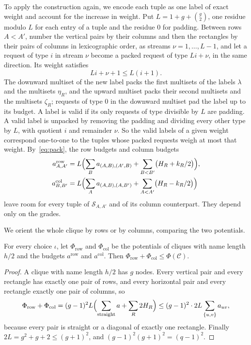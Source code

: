\documentclass[11pt]{article}
\theoremstyle{definition}
\theoremstyle{definition}
\theoremstyle{remark}
\newcommand{\row}{\mathrm{row}}
\newcommand{\col}{\mathrm{col}}
\begin{document}
To apply the construction again, we encode each tuple as one label of exact weight and account for the increase in weight. Put $L=1+g+\binom g2$, one residue modulo $L$ for each entry of a tuple and the residue $0$ for padding. Between rows $A<A'$, number the vertical pairs by their columns and then the rectangles by their pairs of columns in lexicographic order, as streams $\nu=1,\dots,L-1$, and let a request of type $i$ in stream $\nu$ become a packed request of type $Li+\nu$, in the same direction. Its weight satisfies
\begin{equation}\label{eq:pack}
Li+\nu+1\le L(i+1).
\end{equation}
The downward multiset of the new label packs the first multisets of the labels $\lambda$ and the multisets $\eta_R$, and the upward multiset packs their second multisets and the multisets $\zeta_R$; requests of type $0$ in the downward multiset pad the label up to its budget. A label is valid if its only requests of type divisible by $L$ are padding. A valid label is unpacked by removing the padding and dividing every other type by $L$, with quotient $i$ and remainder $\nu$. So the valid labels of a given weight correspond one-to-one to the tuples whose packed requests weigh at most that weight. By~\eqref{eq:pack}, the row budgets and column budgets
\begin{align*}
a^\row_{A,A'}&=L\Bigl(\sum_Ba_{(A,B),(A',B)}+\sum_{B<B'}\bigl(H_R+k_R/2\bigr)\Bigr),\\
a^\col_{B,B'}&=L\Bigl(\sum_Aa_{(A,B),(A,B')}+\sum_{A<A'}\bigl(H_R-k_R/2\bigr)\Bigr)
\end{align*}
leave room for every tuple of $\mathcal S_{A,A'}$ and of its column counterpart. They depend only on the grades.

We orient the whole clique by rows or by columns, comparing the two potentials.

\begin{lemma}\label{lem:energy}
For every choice $\iota$, let $\Phi_\row$ and $\Phi_\col$ be the potentials of cliques with name length $h/2$ and the budgets $a^\row$ and $a^\col$. Then $\Phi_\row+\Phi_\col\le \Phi(\mathcal C)$.
\end{lemma}

\begin{proof}
A clique with name length $h/2$ has $g$ nodes. Every vertical pair and every rectangle has exactly one pair of rows, and every horizontal pair and every rectangle exactly one pair of columns, so
\[
\Phi_\row+\Phi_\col=(g-1)^2L\Bigl(\sum_{\text{straight}}a+\sum_R2H_R\Bigr)\le(g-1)^2\cdot2L\sum_{\{u,v\}}a_{uv},
\]
because every pair is straight or a diagonal of exactly one rectangle. Finally $2L=g^2+g+2\le(g+1)^2$, and $(g-1)^2(g+1)^2=(q-1)^2$.
\end{proof}
\end{document}

